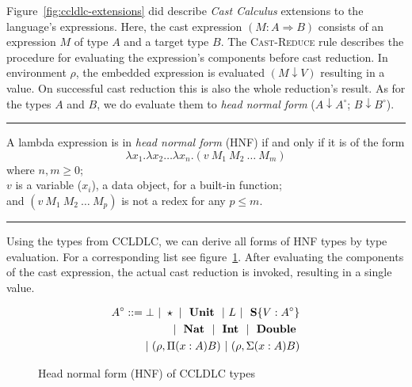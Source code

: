 Figure~\ref{fig:ccldlc-extensions} did describe \emph{Cast Calculus} extensions to the language's expressions. Here, the cast expression $(M : A \Rightarrow B)$ consists of an expression $M$ of type $A$ and a target type $B$. The \textsc{Cast-Reduce} rule describes the procedure for evaluating the expression's components before cast reduction.  In environment $\rho$, the embedded expression is evaluated $(M \downarrow V)$ resulting in a value. On successful cast reduction this is also the whole reduction's result. As for the types $A$ and $B$, we do evaluate them to \emph{head normal form} ($A \downarrow A^\circ$; $B \downarrow B^\circ$).

\vspace{4ex}\hrule

\renewcommand{\mkcitation}[1]{\\--- #1}
\begin{displayquote}
A lambda expression is in \emph{head normal form} (HNF) if and only if it is of the form
\begin{equation*}
\lambda x_1 . \lambda x_2 \dots \lambda x_n . (v~M_1~M_2~\dots~M_m)
\end{equation*}
where $n, m \geq 0$; \\
\hspace*{11mm}$v$ is a variable ($x_i$), a data object, for a built-in function; \\
and \hspace*{2mm} $(v~M_1~M_2~\dots~M_p)$ is not a redex for any $p \leq m$.
\end{displayquote}

\hrule\vspace{4ex}

Using the types from CCLDLC, we can derive all forms of HNF types by type evaluation. For a corresponding list see figure~\ref{fig:ccldlc-hnf}. After evaluating the components of the cast expression, the actual cast reduction is invoked, resulting in a single value.

\begin{figure}
\begin{equation}
\begin{split}
 A^\circ ::= \bot ~|~ \star ~|~ \text{ \textbf{Unit} } ~|~ L ~|~ \text{ \textbf{S}}\{V:A^\circ\} \\
 |~\text{ \textbf{Nat} } ~|~ \text{ \textbf{Int} } ~|~ \text{ \textbf{Double} } \\
 |~ (\rho, \Pi(x:A)B) ~|~ (\rho, \Sigma(x:A)B)
\end{split}
\end{equation}
\caption{Head normal form (HNF) of CCLDLC types}
\label{fig:ccldlc-hnf}
\end{figure}

